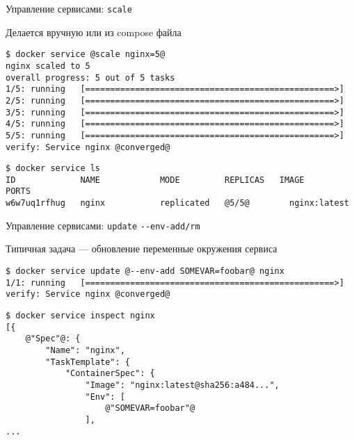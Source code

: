 \begin{frame}[fragile]{Управление сервисами: \texttt{scale}}

Делается вручную или из compose файла

\begin{tcolorbox-code}
\begin{lstlisting}[style=base]
$ docker service @scale nginx=5@
nginx scaled to 5
overall progress: 5 out of 5 tasks 
1/5: running   [==================================================>] 
2/5: running   [==================================================>] 
3/5: running   [==================================================>] 
4/5: running   [==================================================>] 
5/5: running   [==================================================>] 
verify: Service nginx @converged@
\end{lstlisting}
\end{tcolorbox-code}

\begin{tcolorbox-code}
\begin{lstlisting}[style=base]
$ docker service ls
ID             NAME            MODE         REPLICAS   IMAGE          PORTS
w6w7uq1rfhug   nginx           replicated   @5/5@        nginx:latest   
\end{lstlisting}
\end{tcolorbox-code}

\end{frame}



\begin{frame}[fragile]{Управление сервисами: \texttt{update} \texttt{-{}-env-add/rm} }

Типичная задача --- обновление переменные окружения сервиса

\begin{tcolorbox-code}
\begin{lstlisting}[style=base]
$ docker service update @--env-add SOMEVAR=foobar@ nginx
1/1: running   [==================================================>] 
verify: Service nginx @converged@
\end{lstlisting}
\end{tcolorbox-code}

\begin{tcolorbox-code}
\begin{lstlisting}[style=base]
$ docker service inspect nginx
[{
    @"Spec"@: {
        "Name": "nginx",
        "TaskTemplate": {
            "ContainerSpec": {
                "Image": "nginx:latest@sha256:a484...",
                "Env": [
                    @"SOMEVAR=foobar"@
                ],
...
\end{lstlisting}
\end{tcolorbox-code}

\end{frame}

